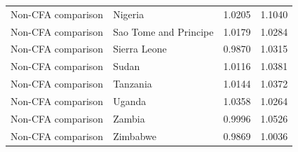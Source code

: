 \begin{table}
\begin{tabular}[t]{llrr}
Non-CFA comparison & Nigeria & 1.0205 & 1.1040\\
Non-CFA comparison & Sao Tome and Principe & 1.0179 & 1.0284\\
Non-CFA comparison & Sierra Leone & 0.9870 & 1.0315\\
\addlinespace
Non-CFA comparison & Sudan & 1.0116 & 1.0381\\
Non-CFA comparison & Tanzania & 1.0144 & 1.0372\\
Non-CFA comparison & Uganda & 1.0358 & 1.0264\\
Non-CFA comparison & Zambia & 0.9996 & 1.0526\\
Non-CFA comparison & Zimbabwe & 0.9869 & 1.0036\\
\bottomrule
\end{tabular}
\end{table}